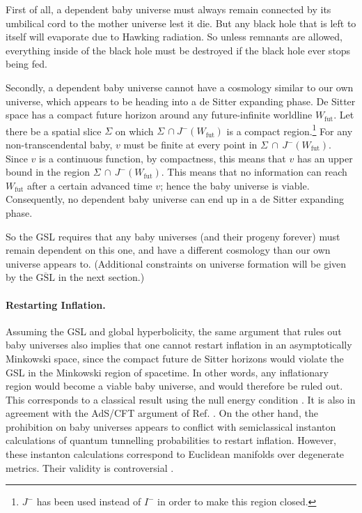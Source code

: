\documentclass{article}
\begin{document}
First of all, a dependent baby universe must always remain connected by its umbilical cord to the mother universe lest it die.  But any black hole that is left to itself will evaporate due to Hawking radiation.  So unless remnants are allowed, everything inside of the black hole must be destroyed if the black hole ever stops being fed.

Secondly, a dependent baby universe cannot have a cosmology similar to our own universe, which appears to be heading into a de Sitter expanding phase.  De Sitter space has a compact future horizon around any future-infinite worldline $W_\mathrm{fut}$.  Let there be a spatial slice $\Sigma$ on which $\Sigma\,\cap J^-(W_\mathrm{fut})$ is a compact region.\footnote{$J^-$ has been used instead of $I^-$ in order to make this region closed.}  For any non-transcendental baby, $v$ must be finite at every point in $\Sigma\,\cap\,J^-(W_\mathrm{fut})$.  Since $v$ is a continuous function, by compactness, this means that $v$ has an upper bound in the region $\Sigma\,\cap\,J^-(W_\mathrm{fut})$.  This means that no information can reach $W_\mathrm{fut}$ after a certain advanced time $v$; hence the baby universe is viable.  Consequently, no dependent baby universe can end up in a de Sitter expanding phase.

So the GSL requires that any baby universes (and their progeny forever) must remain dependent on this one, and have a different cosmology than our own universe appears to.  (Additional constraints on universe formation will be given by the $\overline{\mathrm{GSL}}$ in the next section.)

\paragraph{Restarting Inflation.} Assuming the GSL and global hyperbolicity, the same argument that rules out baby universes also implies that one cannot restart inflation in an asymptotically Minkowski space, since the compact future de Sitter horizons would violate the GSL in the Minkowski region of spacetime.  In other words, any inflationary region would become a viable baby universe, and would therefore be ruled out.  This corresponds to a classical result using the null energy condition \cite{obstacle}.  It is also in agreement with the AdS/CFT argument of Ref. \cite{myers}.  On the other hand, the prohibition on baby universes appears to conflict with semiclassical instanton calculations \cite{bubble} of quantum tunnelling probabilities to restart inflation.  However, these instanton calculations correspond to Euclidean manifolds over degenerate metrics.  Their validity is controversial \cite{banks}.
\end{document}
